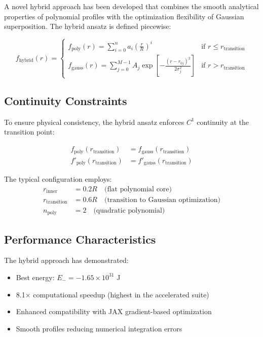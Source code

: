 \documentclass[12pt,a4paper]{article}
\begin{document}
A novel hybrid approach has been developed that combines the smooth analytical properties of polynomial profiles with the optimization flexibility of Gaussian superposition. The hybrid ansatz is defined piecewise:

\begin{equation}
f_{\text{hybrid}}(r) = \begin{cases}
f_{\text{poly}}(r) = \sum_{i=0}^n a_i \left(\frac{r}{R}\right)^i & \text{if } r \leq r_{\text{transition}} \\
f_{\text{gauss}}(r) = \sum_{j=0}^{M-1} A_j \exp\left[-\frac{(r - r_{0j})^2}{2\sigma_j^2}\right] & \text{if } r > r_{\text{transition}}
\end{cases}
\end{equation}

\subsection{Continuity Constraints}

To ensure physical consistency, the hybrid ansatz enforces $C^1$ continuity at the transition point:

\begin{align}
f_{\text{poly}}(r_{\text{transition}}) &= f_{\text{gauss}}(r_{\text{transition}}) \\
f'_{\text{poly}}(r_{\text{transition}}) &= f'_{\text{gauss}}(r_{\text{transition}})
\end{align}

The typical configuration employs:
\begin{align}
r_{\text{inner}} &= 0.2R \quad \text{(flat polynomial core)} \\
r_{\text{transition}} &= 0.6R \quad \text{(transition to Gaussian optimization)} \\
n_{\text{poly}} &= 2 \quad \text{(quadratic polynomial)}
\end{align}

\subsection{Performance Characteristics}

The hybrid approach has demonstrated:
\begin{itemize}
\item Best energy: $E_- = -1.65 \times 10^{31}$ J
\item 8.1× computational speedup (highest in the accelerated suite)
\item Enhanced compatibility with JAX gradient-based optimization
\item Smooth profiles reducing numerical integration errors
\end{itemize}
\end{document}
